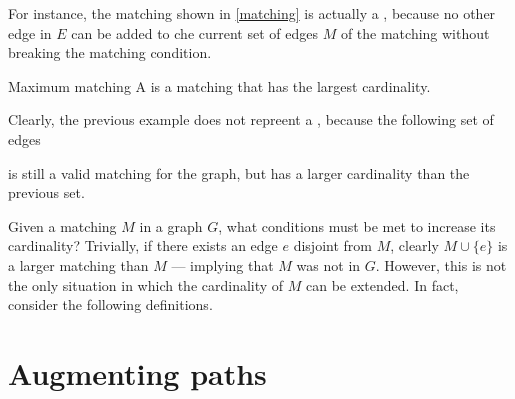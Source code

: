 \documentclass[a4paper, 12pt]{report}
\begin{document}
    For instance, the matching shown in \cref{matching} is actually a , because no other edge in $E$ can be added to che current set of edges $M$ of the matching without breaking the matching condition.

    \begin{frameddefn}{Maximum matching}
        A  is a matching that has the largest cardinality.
    \end{frameddefn}

    Clearly, the previous example does not repreent a , because the following set of edges

     \begin{figure}[H]
        \centering
    \end{figure}

    is still a valid matching for the graph, but has a larger cardinality than the previous set.

    Given a matching $M$ in a graph $G$, what conditions must be met to increase its cardinality? Trivially, if there exists an edge $e$ disjoint from $M$, clearly $M \cup \{e\}$ is a larger matching than $M$ --- implying that $M$ was not  in $G$. However, this is not the only situation in which the cardinality of $M$ can be extended. In fact, consider the following definitions.

    \section{Augmenting paths}
\end{document}
